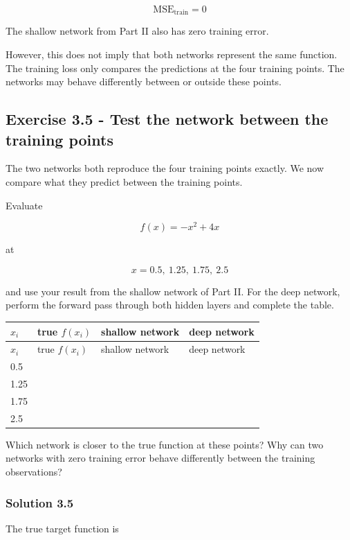 \documentclass[10pt]{article}
\begin{document}
\[
\mathrm{MSE}_{\mathrm{train}}=0
\]

The shallow network from Part II also has zero training error.

However, this does not imply that both networks represent the same function. The training loss only compares the predictions at the four training points. The networks may behave differently between or outside these points.

\par\endgroup

\subsection*{Exercise 3.5 - Test the network between the training points}
The two networks both reproduce the four training points exactly. We now compare what they predict between the training points.

Evaluate

\[
f(x)=-x^2+4x
\]

at

\[
x=0.5,\ 1.25,\ 1.75,\ 2.5
\]

and use your result from the shallow network of Part II. For the deep network, perform the forward pass through both hidden layers and complete the table.

\begingroup
\small
\setlength{\tabcolsep}{4pt}
\begin{longtable}{l|l|l|l}
$x_i$ & true $f(x_i)$ & shallow network & deep network \\[1.5pt]
\hline
\endfirsthead
$x_i$ & true $f(x_i)$ & shallow network & deep network \\[1.5pt]
\hline
\endhead
\rule{0pt}{2.4ex}0.5 &  $\phantom{-0.00}$ &  $\phantom{-0.00}$ &  $\phantom{-0.00}$ \\[3pt]
\rule{0pt}{2.4ex}1.25 &  $\phantom{-0.00}$ &  $\phantom{-0.00}$ &  $\phantom{-0.00}$ \\[3pt]
\rule{0pt}{2.4ex}1.75 &  $\phantom{-0.00}$ &  $\phantom{-0.00}$ &  $\phantom{-0.00}$ \\[3pt]
\rule{0pt}{2.4ex}2.5 &  $\phantom{-0.00}$ &  $\phantom{-0.00}$ &  $\phantom{-0.00}$ \\[3pt]
\end{longtable}
\endgroup
Which network is closer to the true function at these points? Why can two networks with zero training error behave differently between the training observations?

\begingroup\color{red}

\subsubsection*{Solution 3.5}
The true target function is
\end{document}
